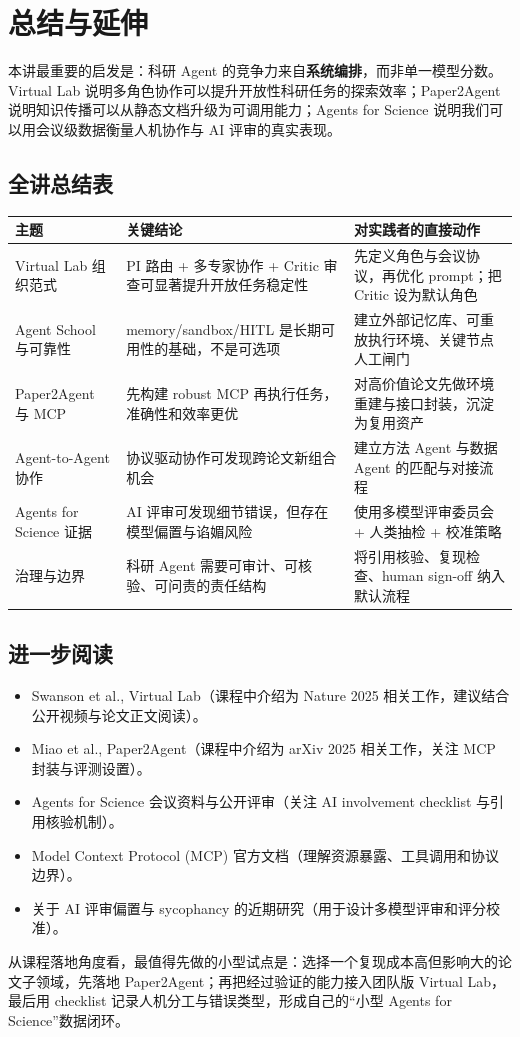 \section{总结与延伸}

本讲最重要的启发是：科研 Agent 的竞争力来自\textbf{系统编排}，而非单一模型分数。Virtual Lab 说明多角色协作可以提升开放性科研任务的探索效率；Paper2Agent 说明知识传播可以从静态文档升级为可调用能力；Agents for Science 说明我们可以用会议级数据衡量人机协作与 AI 评审的真实表现。

\subsection*{全讲总结表}

\begin{table}[H]
\centering
\small
\begin{tabular}{p{}p{}p{}}
\toprule
主题 & 关键结论 & 对实践者的直接动作 \\
\midrule
Virtual Lab 组织范式 & PI 路由 + 多专家协作 + Critic 审查可显著提升开放任务稳定性 & 先定义角色与会议协议，再优化 prompt；把 Critic 设为默认角色 \\
Agent School 与可靠性 & memory/sandbox/HITL 是长期可用性的基础，不是可选项 & 建立外部记忆库、可重放执行环境、关键节点人工闸门 \\
Paper2Agent 与 MCP & 先构建 robust MCP 再执行任务，准确性和效率更优 & 对高价值论文先做环境重建与接口封装，沉淀为复用资产 \\
Agent-to-Agent 协作 & 协议驱动协作可发现跨论文新组合机会 & 建立方法 Agent 与数据 Agent 的匹配与对接流程 \\
Agents for Science 证据 & AI 评审可发现细节错误，但存在模型偏置与谄媚风险 & 使用多模型评审委员会 + 人类抽检 + 校准策略 \\
治理与边界 & 科研 Agent 需要可审计、可核验、可问责的责任结构 & 将引用核验、复现检查、human sign-off 纳入默认流程 \\
\bottomrule
\end{tabular}
\end{table}

\subsection*{进一步阅读}

\begin{itemize}
    \item Swanson et al., Virtual Lab（课程中介绍为 Nature 2025 相关工作，建议结合公开视频与论文正文阅读）。
    \item Miao et al., Paper2Agent（课程中介绍为 arXiv 2025 相关工作，关注 MCP 封装与评测设置）。
    \item Agents for Science 会议资料与公开评审（关注 AI involvement checklist 与引用核验机制）。
    \item Model Context Protocol (MCP) 官方文档（理解资源暴露、工具调用和协议边界）。
    \item 关于 AI 评审偏置与 sycophancy 的近期研究（用于设计多模型评审和评分校准）。
\end{itemize}

从课程落地角度看，最值得先做的小型试点是：选择一个复现成本高但影响大的论文子领域，先落地 Paper2Agent；再把经过验证的能力接入团队版 Virtual Lab，最后用 checklist 记录人机分工与错误类型，形成自己的``小型 Agents for Science''数据闭环。


